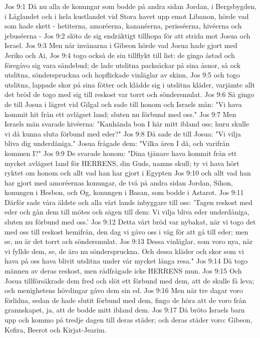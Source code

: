Jos 9:1  Då nu alla de konungar som bodde på andra sidan Jordan, i Bergsbygden, i Låglandet och i hela kustlandet vid Stora havet upp emot Libanon, hörde vad som hade skett - hetiterna, amoréerna, kananéerna, perisséerna, hivéerna och jebuséerna -
Jos 9:2  slöto de sig endräktigt tillhopa för att strida mot Josua och Israel.
Jos 9:3  Men när invånarna i Gibeon hörde vad Josua hade gjort med Jeriko och Ai,
Jos 9:4  togo också de sin tillflykt till list: de gingo åstad och föregåvo sig vara sändebud; de lade utslitna packsäckar på sina åsnor, så ock utslitna, sönderspruckna och hopflickade vinläglar av skinn,
Jos 9:5  och togo utslitna, lappade skor på sina fötter och klädde sig i utslitna kläder, varjämte allt det bröd de togo med sig till reskost var torrt och söndersmulat.
Jos 9:6  Så gingo de till Josua i lägret vid Gilgal och sade till honom och Israels män: "Vi hava kommit hit från ett avlägset land; sluten nu förbund med oss."
Jos 9:7  Men Israels män svarade hivéerna: "Kanhända bon I här mitt ibland oss; huru skulle vi då kunna sluta förbund med eder?"
Jos 9:8  Då sade de till Josua: "Vi vilja bliva dig underdåniga." Josua frågade dem: "Vilka ären I då, och varifrån kommen I?"
Jos 9:9  De svarade honom: "Dina tjänare hava kommit från ett mycket avlägset land för HERRENS, din Guds, namns skull; ty vi hava hört ryktet om honom och allt vad han har gjort i Egypten
Jos 9:10  och allt vad han har gjort med amoréernas konungar, de två på andra sidan Jordan, Sihon, konungen i Hesbon, och Og, konungen i Basan, som bodde i Astarot.
Jos 9:11  Därför sade våra äldste och alla vårt lands inbyggare till oss: 'Tagen reskost med eder och gån dem till mötes och sägen till dem: Vi vilja bliva eder underdåniga, sluten nu förbund med oss.'
Jos 9:12  Detta vårt bröd var nybakat, när vi togo det med oss till reskost hemifrån, den dag vi gåvo oss i väg för att gå till eder; men se, nu är det torrt och söndersmulat.
Jos 9:13  Dessa vinläglar, som voro nya, när vi fyllde dem, se, de äro nu sönderspruckna. Och dessa kläder och skor som vi hava på oss hava blivit utslitna under vår mycket långa resa."
Jos 9:14  Då togo männen av deras reskost, men rådfrågade icke HERRENS mun.
Jos 9:15  Och Josua tillförsäkrade dem fred och slöt ett förbund med dem, att de skulle få leva; och menighetens hövdingar gåvo dem sin ed.
Jos 9:16  Men när tre dagar voro förlidna, sedan de hade slutit förbund med dem, fingo de höra att de voro från grannskapet, ja, att de bodde mitt ibland dem.
Jos 9:17  Då bröto Israels barn upp och kommo på tredje dagen till deras städer; och deras städer voro: Gibeon, Kefira, Beerot och Kirjat-Jearim.

